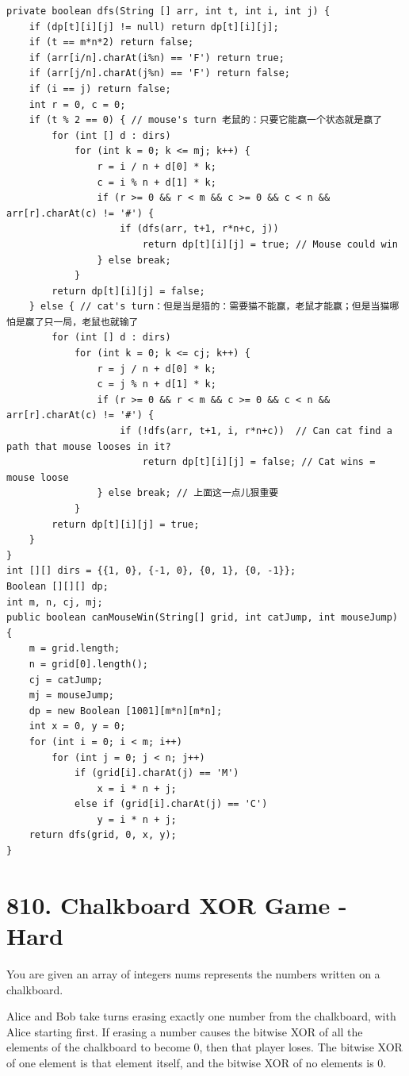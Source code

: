 \documentclass[9pt, b5paaper]{book}
\begin{document}
\begin{verbatim}
private boolean dfs(String [] arr, int t, int i, int j) {
    if (dp[t][i][j] != null) return dp[t][i][j];
    if (t == m*n*2) return false;
    if (arr[i/n].charAt(i%n) == 'F') return true;
    if (arr[j/n].charAt(j%n) == 'F') return false;
    if (i == j) return false;
    int r = 0, c = 0;
    if (t % 2 == 0) { // mouse's turn 老鼠的：只要它能赢一个状态就是赢了
        for (int [] d : dirs) 
            for (int k = 0; k <= mj; k++) {
                r = i / n + d[0] * k;
                c = i % n + d[1] * k;
                if (r >= 0 && r < m && c >= 0 && c < n && arr[r].charAt(c) != '#') {
                    if (dfs(arr, t+1, r*n+c, j))
                        return dp[t][i][j] = true; // Mouse could win
                } else break;
            }
        return dp[t][i][j] = false;
    } else { // cat's turn：但是当是猎的：需要猫不能赢，老鼠才能赢；但是当猫哪怕是赢了只一局，老鼠也就输了
        for (int [] d : dirs) 
            for (int k = 0; k <= cj; k++) {
                r = j / n + d[0] * k;
                c = j % n + d[1] * k;
                if (r >= 0 && r < m && c >= 0 && c < n && arr[r].charAt(c) != '#') {
                    if (!dfs(arr, t+1, i, r*n+c))  // Can cat find a path that mouse looses in it?
                        return dp[t][i][j] = false; // Cat wins = mouse loose
                } else break; // 上面这一点儿狠重要
            }
        return dp[t][i][j] = true;
    }
}
int [][] dirs = {{1, 0}, {-1, 0}, {0, 1}, {0, -1}};
Boolean [][][] dp;
int m, n, cj, mj;
public boolean canMouseWin(String[] grid, int catJump, int mouseJump) {
    m = grid.length;
    n = grid[0].length();
    cj = catJump;
    mj = mouseJump;
    dp = new Boolean [1001][m*n][m*n];
    int x = 0, y = 0;
    for (int i = 0; i < m; i++) 
        for (int j = 0; j < n; j++) 
            if (grid[i].charAt(j) == 'M')
                x = i * n + j;
            else if (grid[i].charAt(j) == 'C')
                y = i * n + j;
    return dfs(grid, 0, x, y);
}
\end{verbatim}

\section{810. Chalkboard XOR Game - Hard}
\label{sec-1-21}
You are given an array of integers nums represents the numbers written on a chalkboard.

Alice and Bob take turns erasing exactly one number from the chalkboard, with Alice starting first. If erasing a number causes the bitwise XOR of all the elements of the chalkboard to become 0, then that player loses. The bitwise XOR of one element is that element itself, and the bitwise XOR of no elements is 0.
\end{document}

